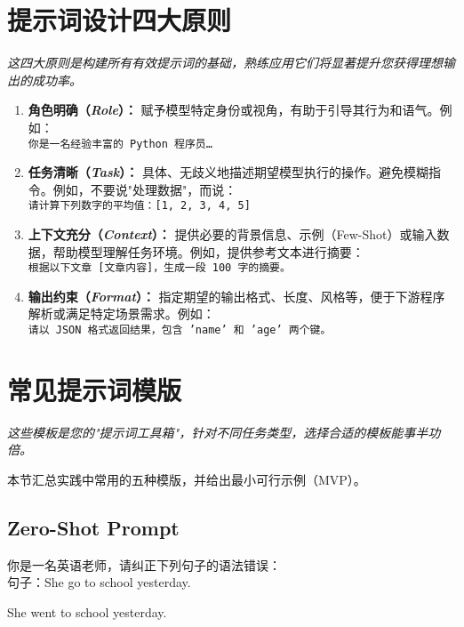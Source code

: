 \documentclass[12pt]{ctexart}
\newcommand{\chapternote}[1]{\vspace{-0.3cm}\par\noindent\textit{\small #1}\vspace{0.3cm}}
\begin{document}
\section{提示词设计四大原则}
\chapternote{这四大原则是构建所有有效提示词的基础，熟练应用它们将显著提升您获得理想输出的成功率。}

\begin{enumerate}[wide, labelwidth=!, labelsep=1em]
  \item \textbf{角色明确（\emph{Role}）：} 赋予模型特定身份或视角，有助于引导其行为和语气。例如：\\
  \texttt{你是一名经验丰富的 Python 程序员…}
  \item \textbf{任务清晰（\emph{Task}）：} 具体、无歧义地描述期望模型执行的操作。避免模糊指令。例如，不要说"处理数据"，而说：\\
  \texttt{请计算下列数字的平均值：[1, 2, 3, 4, 5]}
  \item \textbf{上下文充分（\emph{Context}）：} 提供必要的背景信息、示例（Few-Shot）或输入数据，帮助模型理解任务环境。例如，提供参考文本进行摘要：\\
  \texttt{根据以下文章 [文章内容]，生成一段 100 字的摘要。}
  \item \textbf{输出约束（\emph{Format}）：} 指定期望的输出格式、长度、风格等，便于下游程序解析或满足特定场景需求。例如：\\
  \texttt{请以 JSON 格式返回结果，包含 'name' 和 'age' 两个键。}
\end{enumerate}

\section{常见提示词模版}
\chapternote{这些模板是您的"提示词工具箱"，针对不同任务类型，选择合适的模板能事半功倍。}

本节汇总实践中常用的五种模版，并给出最小可行示例（MVP）。

\subsection{Zero-Shot Prompt}
\begin{promptbox}
你是一名英语老师，请纠正下列句子的语法错误：\\
句子：She go to school yesterday.
\end{promptbox}
\begin{outputbox}
She went to school yesterday.
\end{outputbox}
\end{document}
